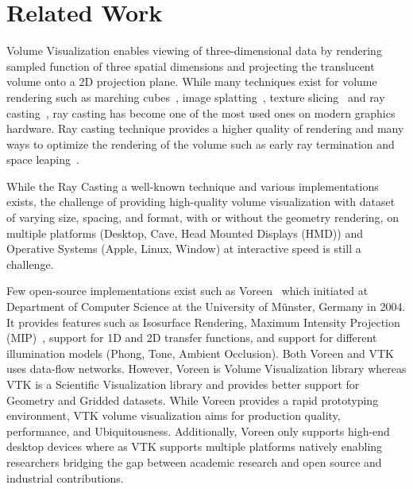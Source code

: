 \section{Related Work}
\label{relatedwork}

Volume Visualization enables viewing of three-dimensional data by rendering
sampled function of three spatial dimensions and projecting the translucent
volume onto a 2D projection plane. While many techniques exist for volume
rendering such as marching cubes~\citep{lorensen_marching_1987}, image
splatting~\citep{westover_footprint_1990}, texture
slicing~\citep{rezk-salama_interactive_2000, engel_high-quality_2001} and ray
casting~\citep{hsu_segmented_1993, ma_parallel_1995, ma_scalable_1997,
heng_gpu-based_2005}, ray casting has become one of the most used ones on modern
graphics hardware. Ray casting technique provides a higher quality of rendering
and many ways to optimize the rendering of the volume such as early ray
termination and space leaping~\citep{yagel_accelerating_1993}.

While the Ray Casting a well-known technique and various implementations exists,
the challenge of providing high-quality volume visualization with dataset of
varying size, spacing, and format, with or without the geometry rendering, on
multiple platforms (Desktop, Cave, Head Mounted Displays (HMD)) and Operative
Systems (Apple, Linux, Window) at interactive speed is still a challenge.

Few open-source implementations exist such as
Voreen~\citep{meyer-spradow_voreen:_2009} which initiated at Department of
Computer Science at the University of Münster, Germany in 2004.  It provides
features such as Isosurface Rendering, Maximum Intensity Projection
(MIP)~\citep{wallis_three-dimensional_1989}, support for 1D and 2D transfer
functions, and support for different illumination models (Phong, Tone, Ambient
Occlusion). Both Voreen and VTK uses data-flow networks. However, Voreen is
Volume Visualization library whereas VTK is a Scientific Visualization library
and provides better support for Geometry and Gridded datasets. While Voreen
provides a rapid prototyping environment, VTK volume visualization aims for
production quality, performance, and Ubiquitousness. Additionally, Voreen only
supports high-end desktop devices where as VTK supports multiple platforms
natively enabling researchers bridging the gap between academic research and
open source and industrial contributions.

